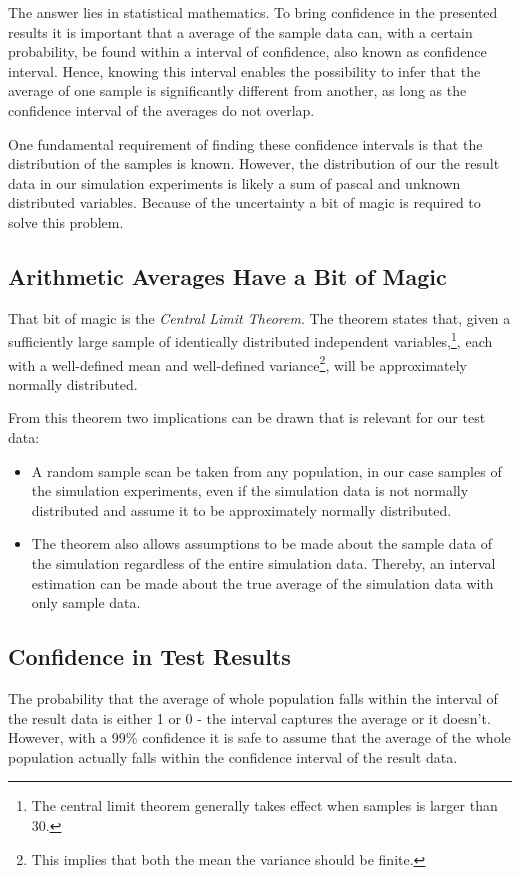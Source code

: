 \documentclass[a4paper,11pt]{kth-mag}
\begin{document}
The answer lies in statistical mathematics. To bring confidence in the presented results it is important that a average of the sample data can, with a certain probability, be found within a interval of confidence, also known as confidence interval. Hence, knowing this interval enables the possibility to infer that the average of one sample is significantly different from another, as long as the confidence interval of the averages do not overlap.

One fundamental requirement of finding these confidence intervals is that the distribution of the samples is known. However, the distribution of our the result data in our simulation experiments is likely a sum of pascal and unknown distributed variables. Because of the uncertainty a bit of magic is required to solve this problem. 

\subsection{Arithmetic Averages Have a Bit of Magic}
That bit of magic is the \emph{Central Limit Theorem}. The theorem states that, given a sufficiently large sample of identically distributed independent variables,\footnote{The central limit theorem generally takes effect when samples is larger than 30.}, each with a well-defined mean and well-defined variance\footnote{This implies that both the mean the variance should be finite.}, will be approximately normally distributed\cite{gunnar}.

From this theorem two implications can be drawn that is relevant for our test data:
\begin{itemize}
\item A random sample scan be taken from any population, in our case samples of the simulation experiments, even if the simulation data is not normally distributed and assume it to be approximately normally distributed.

\item The theorem also allows assumptions to be made about the sample data of the simulation regardless of the entire simulation data. Thereby, an interval estimation can be made about the true average of the simulation data with only sample data.
\end{itemize}

 \subsection{Confidence in Test Results}
The probability that the average of whole population falls within the interval of the result data is either 1 or 0 - the interval captures the average or it doesn't\cite{gunnar}. However, with a 99\% confidence it is safe to assume that the average of the whole population actually falls within the confidence interval of the result data. 


\begin{comment}
\begin{figure}[ht] 
\begin{center}
And here is a figure 
\caption{\small{Several statements describing the same resource.}}\label{RDF_4}
\end{center}
\end{figure}


that we refer to here: \ref{RDF_4}
\end{comment}
\printbibliography
\end{document}
